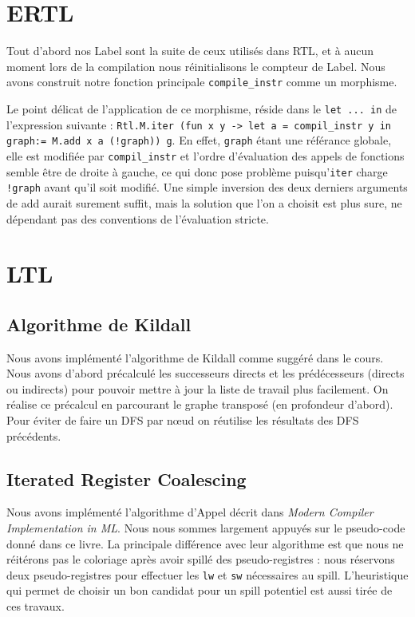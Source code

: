 \documentclass[a4paper]{article}
\begin{document}
\section{ERTL}

Tout d'abord nos Label sont la suite de ceux utilisés dans RTL, et à
aucun moment lors de la compilation nous réinitialisons le compteur de
Label. Nous avons construit notre fonction principale
\texttt{compile\_instr} comme un morphisme.

Le point délicat de l'application de ce morphisme, réside dans le \texttt{let ... in} de l'expression suivante :
\texttt{Rtl.M.iter (fun x y -> let a = compil\_instr y in graph:= M.add
x a (!graph)) g}. En effet, \texttt{graph} étant une référance globale, elle est
modifiée par \texttt{compil\_instr} et l'ordre d'évaluation des appels
de fonctions semble être de droite à gauche, ce qui donc pose problème
puisqu'\texttt{iter} charge \texttt{!graph} avant qu'il soit modifié. Une simple inversion des
deux derniers arguments de add aurait surement suffit, mais la solution que l'on a choisit est
plus sure, ne dépendant pas des conventions de l'évaluation stricte.
\section{LTL}
\subsection{Algorithme de Kildall}

Nous avons implémenté l'algorithme de Kildall comme suggéré dans le cours. Nous avons d'abord précalculé
les successeurs directs et les prédécesseurs (directs ou indirects) pour pouvoir mettre à jour la liste de
travail plus facilement. On réalise ce précalcul en parcourant le graphe transposé (en profondeur d'abord).
Pour éviter de faire un DFS par nœud on réutilise les résultats des DFS précédents.

\subsection{Iterated Register Coalescing}

Nous avons implémenté l'algorithme d'Appel décrit dans \emph{Modern Compiler Implementation in ML}.
Nous nous sommes largement appuyés sur le pseudo-code donné dans ce livre. La principale différence avec
leur algorithme est que nous ne réitérons pas le coloriage après avoir spillé des pseudo-registres :
nous réservons deux pseudo-registres pour effectuer les \texttt{lw} et \texttt{sw} nécessaires au spill.
L'heuristique qui permet de choisir un bon candidat pour un spill potentiel est aussi tirée de ces travaux.
\end{document}
